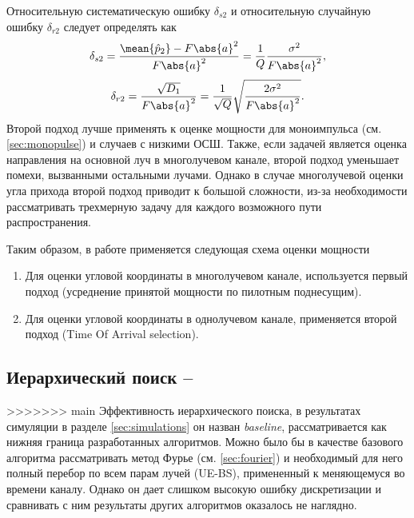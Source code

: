 Относительную систематическую ошибку $\delta_{s2}$ и относительную случайную ошибку $\delta_{r2}$ следует
определять как
\begin{equation}
    \delta_{s2} = \frac{\mean{\hat p_2} - F \abs{a}^2}{F \abs{a}^2} = \frac{1}{Q} \frac{\sigma^2}{F\abs{a}^2},
\end{equation}
\begin{equation}
    \delta_{r2} = \frac{\sqrt{D_1}}{F\abs{a}^2} = \frac{1}{\sqrt Q} \sqrt{\frac{2\sigma^2}{F\abs{a}^2}}.
\end{equation}
Второй подход лучше применять к оценке мощности для моноимпульса (см. \ref{sec:monopulse}) и случаев с
низкими ОСШ. Также, если задачей является оценка направления на основной луч в
многолучевом канале, второй подход уменьшает помехи, вызванными остальными лучами.
Однако в случае многолучевой оценки угла прихода второй подход приводит к
большой сложности, из-за необходимости рассматривать трехмерную задачу для
каждого возможного пути распространения.

Таким образом, в работе применяется следующая схема оценки мощности
\begin{enumerate}
    \item Для оценки угловой координаты в многолучевом канале, используется
    первый подход (усреднение принятой мощности по пилотным поднесущим). 
    \item Для оценки угловой координаты в однолучевом канале, применяется второй
    подход (Time Of Arrival selection). 
\end{enumerate}



\subsection[Иерархический поиск]{Иерархический поиск -- \baseline{}}
\label{sec:hSearch}\label{sec:hierarchy:search}
>>>>>>> main
Эффективность иерархического поиска, в результатах симуляции в разделе
\ref{sec:simulations} он назван \textit{baseline}, рассматривается как нижняя
граница разработанных алгоритмов.  Можно было бы в качестве базового алгоритма рассматривать
метод Фурье (см. \ref{sec:fourier}) и необходимый для него полный перебор
по всем парам лучей (UE-BS), примененный к меняющемуся во времени каналу.
Однако он дает слишком высокую ошибку дискретизации и сравнивать с ним
результаты других алгоритмов оказалось не наглядно.

